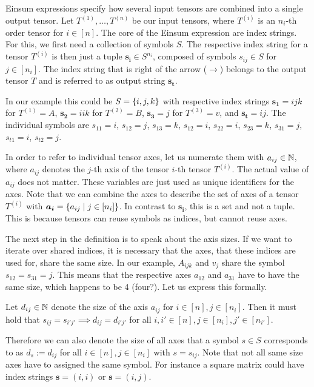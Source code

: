 \begin{definition}
    Einsum expressions specify how several input tensors are combined into a single output tensor.
    Let $T^{(1)},\dots,T^{(n)}$ be our input tensors,
    where $T^{(i)}$ is an $n_i$-th order tensor for $i \in [n]$.
    The core of the Einsum expression are index strings. For this, we first need a collection of symbols $S$.
    The respective index string for a tensor $T^{(i)}$ is then just a tuple $\bm{s_i} \in S^{n_i}$,
    composed of symbols $s_{ij} \in S$ for $j \in [n_i]$.
    The index string that is right of the arrow ($\rightarrow$) belongs to the output tensor $T$ and is referred to as output string $\bm{s_t}$.

    In our example this could be $S = \lbrace i,j,k \rbrace$ with respective index strings
    $\bm{s_1} = ijk$ for $T^{(1)} = A$,
    $\bm{s_2} = iik$ for $T^{(2)} = B$,
    $\bm{s_3} = j$ for $T^{(3)} = v$,
    and $\bm{s_t} = ij$.
    The individual symbols are $s_{11} = i$, $s_{12} = j$, $s_{13} = k$, $s_{12} = i$, $s_{22} = i$, $s_{23} = k$, $s_{31} = j$, $s_{t1} = i$, $s_{t2} = j$.

    In order to refer to individual tensor axes, let us numerate them with $a_{ij} \in \mathbb{N}$,
    where $a_{ij}$ denotes the $j$-th axis of the tensor $i$-th tensor $T^{(i)}$.
    The actual value of $a_{ij}$ does not matter.
    These variables are just used as unique identifiers for the axes.
    Note that we can combine the axes to describe the set of axes of a tensor $T^{(i)}$ with
    $\bm{a_i} = \lbrace a_{ij} \mid j \in [n_i] \rbrace$.
    In contrast to $\bm{s_i}$, this is a set and not a tuple.
    This is because tensors can reuse symbols as indices, but cannot reuse axes.

    The next step in the definition is to speak about the axis sizes.
    If we want to iterate over shared indices, it is necessary that the axes, that these indices are used for, share the same size.
    In our example, $A_{ijk}$ and $v_j$ share the symbol $s_{12} = s_{31} = j$.
    This means that the respective axes $a_{12}$ and $a_{31}$ have to have the same size, which happens to be 4 (four?).
    Let us express this formally.

    Let $d_{ij} \in \mathbb{N}$ denote the size of the axis $a_{ij}$ for $i \in [n], j \in [n_i]$.
    Then it must hold that $s_{ij} = s_{i'j'} \implies d_{ij} = d_{i'j'}$ for all $i,i' \in [n], j \in [n_i], j' \in [n_{i'}]$.

    Therefore we can also denote the size of all axes that a symbol $s \in S$ corresponds to as $d_s := d_{ij}$ for all $i \in [n], j \in [n_i]$ with $s = s_{ij}$.
    Note that not all same size axes have to assigned the same symbol. For instance a square matrix could have index strings $\bm{s} = (i, i)$ or $\bm{s} = (i, j)$.


\end{definition}

